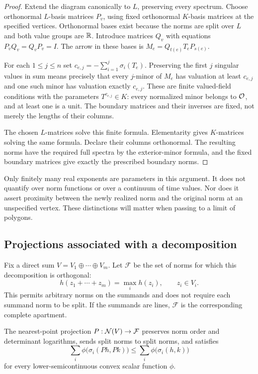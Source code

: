 \begin{proof}
Extend the diagram canonically to $L$, preserving every spectrum.
Choose orthonormal $L$-basis matrices $P_v$, using fixed orthonormal
$K$-basis matrices at the specified vertices. Orthonormal bases exist
because the norms are split over $L$ and both value groups are $\mathbb R$.
Introduce matrices $Q_v$ with equations $P_vQ_v=Q_vP_v=I$.
The arrow in these bases is $M_e=Q_{t(e)}T_eP_{s(e)}$.

For each $1\le j\le n$ set
$c_{e,j}=-\sum_{i=1}^j\sigma_i(T_e)$. Preserving the first $j$
singular values in sum means precisely that every $j$-minor of $M_e$
has valuation at least $c_{e,j}$ and one such minor has valuation
exactly $c_{e,j}$. These are finite valued-field conditions with the
parameters $T^{c_{e,j}}\in K$: every normalized minor belongs to
$\mathcal O$, and at least one is a unit. The boundary matrices and their
inverses are fixed, not merely the lengths of their columns.

The chosen $L$-matrices solve this finite formula. Elementarity gives
$K$-matrices solving the same formula. Declare their columns
orthonormal. The resulting norms have the required full spectra by
the exterior-minor formula, and the fixed boundary matrices give
exactly the prescribed boundary norms.
\end{proof}

Only finitely many real exponents are parameters in this argument.
It does not quantify over norm functions or over a continuum of time
values. Nor does it assert proximity between the newly realized norm
and the original norm at an unspecified vertex. These distinctions
will matter when passing to a limit of polygons.

\subsection{Projections associated with a decomposition}
Fix a direct sum $V=V_1\oplus\cdots\oplus V_m$. Let $\mathcal F$ be
the set of norms for which this decomposition is orthogonal:
\begin{equation}\label{eq:orthogonalblocks}
 h(z_1+\cdots+z_m)=\max_i h(z_i),\qquad z_i\in V_i.
\end{equation}
This permits arbitrary norms on the summands and does not require each
summand norm to be split. If the summands are lines, $\mathcal F$ is
the corresponding complete apartment.

\begin{lemma}\label{lem:blockprojection}
The nearest-point projection $P:\mathcal N(V)\to\mathcal F$ preserves
norm order and determinant logarithms, sends split norms to split norms,
and satisfies
\begin{equation}\label{eq:projectioncost}
 \sum_i\phi\bigl(\sigma_i(Ph,Pk)\bigr)
 \le\sum_i\phi\bigl(\sigma_i(h,k)\bigr)
\end{equation}
for every lower-semicontinuous convex scalar function $\phi$.
\end{lemma}

